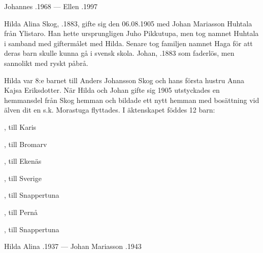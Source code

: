 Johannes .1968   ---    Ellen .1997


Hilda Alina Skog, .1883, gifte sig den 06.08.1905 med Johan Mariasson Huhtala från Ylistaro. Han hette ursprungligen Juho Pikkutupa, men tog namnet Huhtala i samband med giftermålet med Hilda. Senare tog familjen namnet Haga för att deras barn skulle kunna gå i svensk skola. Johan, .1883 som faderlös, men sannolikt med ryskt påbrå.

Hilda var 8:e barnet till Anders Johansson Skog och hans första hustru Anna Kajsa Eriksdotter. När Hilda och Johan gifte sig 1905 utstyckades en hemmansdel från Skog hemman och bildade ett nytt hemman med bosättning vid älven dit en s.k. Morastuga flyttades. I äktenskapet föddes 12 barn:
\begin{jhchildren}
  \item {}
  \item {}
  \item {}
  \item {}, till Karis
  \item {}
  \item {}, till Bromarv
  \item {}, till Ekenäs
  \item {}, till Sverige
  \item {}, till Snappertuna
  \item {}
  \item {}, till Pernå
  \item {}, till Snappertuna
\end{jhchildren}

Hilda Alina .1937  ---   Johan Mariasson .1943



